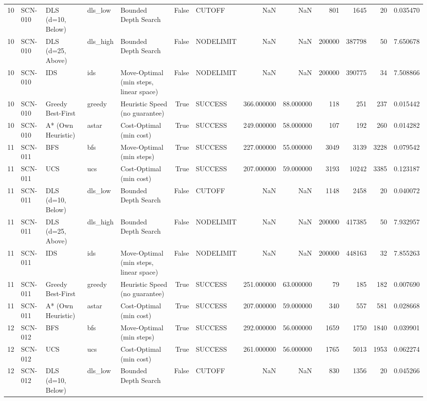 \begin{table}[htbp]
\begin{tabular}{rllllrlrrrrrr}
10 & SCN-010 & DLS (d=10, Below) & dls\_low & Bounded Depth Search & False & CUTOFF & NaN & NaN & 801 & 1645 & 20 & 0.035470 \\
10 & SCN-010 & DLS (d=25, Above) & dls\_high & Bounded Depth Search & False & NODELIMIT & NaN & NaN & 200000 & 387798 & 50 & 7.650678 \\
10 & SCN-010 & IDS & ids & Move-Optimal (min steps, linear space) & False & NODELIMIT & NaN & NaN & 200000 & 390775 & 34 & 7.508866 \\
10 & SCN-010 & Greedy Best-First & greedy & Heuristic Speed (no guarantee) & True & SUCCESS & 366.000000 & 88.000000 & 118 & 251 & 237 & 0.015442 \\
10 & SCN-010 & A* (Own Heuristic) & astar & Cost-Optimal (min cost) & True & SUCCESS & 249.000000 & 58.000000 & 107 & 192 & 260 & 0.014282 \\
11 & SCN-011 & BFS & bfs & Move-Optimal (min steps) & True & SUCCESS & 227.000000 & 55.000000 & 3049 & 3139 & 3228 & 0.079542 \\
11 & SCN-011 & UCS & ucs & Cost-Optimal (min cost) & True & SUCCESS & 207.000000 & 59.000000 & 3193 & 10242 & 3385 & 0.123187 \\
11 & SCN-011 & DLS (d=10, Below) & dls\_low & Bounded Depth Search & False & CUTOFF & NaN & NaN & 1148 & 2458 & 20 & 0.040072 \\
11 & SCN-011 & DLS (d=25, Above) & dls\_high & Bounded Depth Search & False & NODELIMIT & NaN & NaN & 200000 & 417385 & 50 & 7.932957 \\
11 & SCN-011 & IDS & ids & Move-Optimal (min steps, linear space) & False & NODELIMIT & NaN & NaN & 200000 & 448163 & 32 & 7.855263 \\
11 & SCN-011 & Greedy Best-First & greedy & Heuristic Speed (no guarantee) & True & SUCCESS & 251.000000 & 63.000000 & 79 & 185 & 182 & 0.007690 \\
11 & SCN-011 & A* (Own Heuristic) & astar & Cost-Optimal (min cost) & True & SUCCESS & 207.000000 & 59.000000 & 340 & 557 & 581 & 0.028668 \\
12 & SCN-012 & BFS & bfs & Move-Optimal (min steps) & True & SUCCESS & 292.000000 & 56.000000 & 1659 & 1750 & 1840 & 0.039901 \\
12 & SCN-012 & UCS & ucs & Cost-Optimal (min cost) & True & SUCCESS & 261.000000 & 56.000000 & 1765 & 5013 & 1953 & 0.062274 \\
12 & SCN-012 & DLS (d=10, Below) & dls\_low & Bounded Depth Search & False & CUTOFF & NaN & NaN & 830 & 1356 & 20 & 0.045266 \\

\end{tabular}
\end{table}
